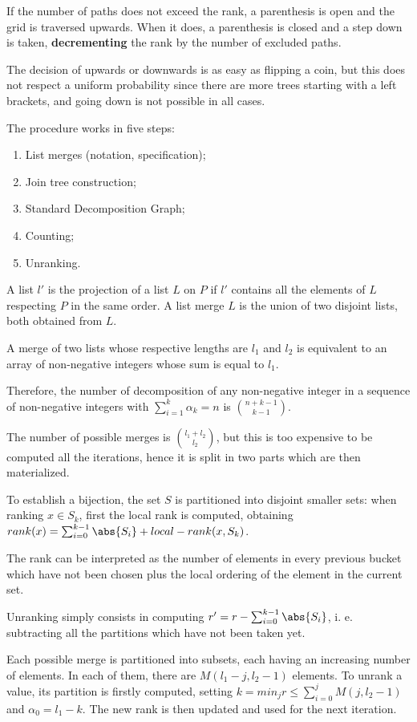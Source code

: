 If the number of paths does not exceed the rank, a parenthesis is open and the grid is traversed upwards. When it does, a parenthesis is closed and a step down is taken, \textbf{decrementing} the rank by the number of excluded paths.

The decision of upwards or downwards is as easy as flipping a coin, but this does not respect a uniform probability since there are more trees starting with a left brackets, and going down is not possible in all cases. 

The procedure works in five steps:
\begin{enumerate}
	\item List merges (notation, specification);
	\item Join tree construction;
	\item Standard Decomposition Graph;
	\item Counting;
	\item Unranking.
\end{enumerate}
A list $l'$ is the projection of a list $L$ on $P$ if $l'$ contains all the elements of $L$ respecting $P$ in the same order. A list merge $L$ is the union of two disjoint lists, both obtained from $L$.

A merge of two lists whose respective lengths are $l_1$ and $l_2$ is equivalent to an array of non-negative integers whose sum is equal to $l_1$. 

Therefore, the number of decomposition of any non-negative integer in a sequence of non-negative integers with $\sum_{i=1}^{k} \alpha_k = n$ is ${n+k-1}\choose{k-1}$.

The number of possible merges is ${l_1+l_2}\choose{l_2}$, but this is too expensive to be computed all the iterations, hence it is split in two parts which are then materialized. 

To establish a bijection, the set $S$ is partitioned into disjoint smaller sets: when ranking $x \in S_k$, first the local rank is computed, obtaining $rank(x) = \sum_{i=0}^{k-1} \abs{S_i} + local-rank(x, S_k)$.

The rank can be interpreted as the number of elements in every previous bucket which have not been chosen plus the local ordering of the element in the current set. 

Unranking simply consists in computing $r' = r - \sum_{i=0}^{k-1} \abs{S_i}$, i. e. subtracting all the partitions which have not been taken yet. 

Each possible merge is partitioned into subsets, each having an increasing number of elements. In each of them, there are $M(l_1 - j, l_2 - 1)$ elements. To unrank a value, its partition is firstly computed, setting $k = min_j r \leq \sum_{i=0}^{j} M(j, l_2 - 1)$ and $\alpha_0 = l_1 - k$. The new rank is then updated and used for the next iteration.

